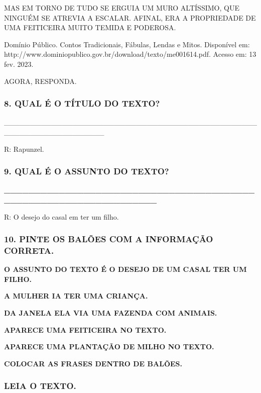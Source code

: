 MAS EM TORNO DE TUDO SE ERGUIA UM MURO ALTÍSSIMO, QUE NINGUÉM SE ATREVIA
A ESCALAR. AFINAL, ERA A PROPRIEDADE DE UMA FEITICEIRA MUITO TEMIDA E
PODEROSA.

Domínio Público. Contos Tradicionais, Fábulas, Lendas e Mitos. Disponível
em: http://www.dominiopublico.gov.br/download/texto/me001614.pdf.
Acesso em: 13 fev. 2023.

AGORA, RESPONDA.\protect\hypertarget{_heading=h.4pnvitxnujbb}{}{}

\subsubsection{8. QUAL É O TÍTULO DO
TEXTO?}\label{qual-uxe9-o-tuxedtulo-do-texto}

\_\_\_\_\_\_\_\_\_\_\_\_\_\_\_\_\_\_\_\_\_\_\_\_\_\_\_\_\_\_\_\_\_\_\_\_\_\_\_\_\_\_\_\_\_\_\_\_\_\_\_\_\_\_\_\_\_\_\_\_\_\_\_\_\_\_\_

R: Rapunzel.

\subsubsection{9. QUAL É O ASSUNTO DO TEXTO?}\label{de-que-fala-o-texto}

\textbf{\_\_\_\_\_\_\_\_\_\_\_\_\_\_\_\_\_\_\_\_\_\_\_\_\_\_\_\_\_\_\_\_\_\_\_\_\_\_\_\_\_\_\_\_\_\_\_\_\_\_\_\_\_\_\_\_\_\_\_\_\_\_\_\_\_\_}

R: O desejo do casal em ter um filho.

\subsubsection{10. PINTE OS BALÕES COM A INFORMAÇÃO
CORRETA.}\label{pinte-os-baluxf5es-com-a-informauxe7uxe3o-correta.}

\textbf{O ASSUNTO DO TEXTO É O DESEJO DE UM CASAL TER UM FILHO.}

\textbf{A MULHER IA TER UMA CRIANÇA.}

\textbf{DA JANELA ELA VIA UMA FAZENDA COM ANIMAIS.}

\textbf{APARECE UMA FEITICEIRA NO TEXTO.}

\textbf{APARECE UMA PLANTAÇÃO DE MILHO NO TEXTO.}

\textbf{COLOCAR AS FRASES DENTRO DE BALÕES.}

\subsubsection{LEIA O TEXTO.}\label{leia-o-texto.-2}

